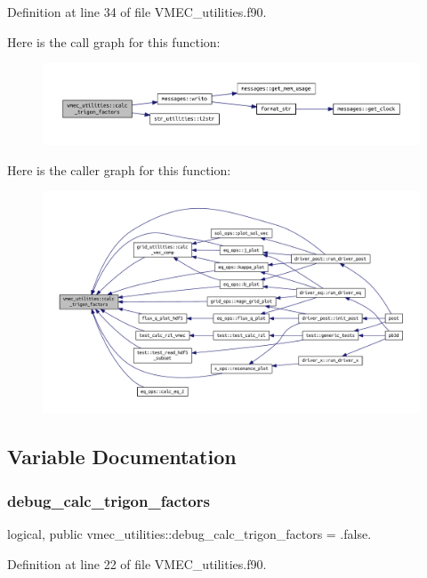 Definition at line 34 of file V\+M\+E\+C\+\_\+utilities.\+f90.

Here is the call graph for this function\+:
\nopagebreak
\begin{figure}[H]
\begin{center}
\leavevmode
\includegraphics[width=350pt]{namespacevmec__utilities_ac699116fc25fdea3e28e488513d97c87_cgraph}
\end{center}
\end{figure}
Here is the caller graph for this function\+:
\nopagebreak
\begin{figure}[H]
\begin{center}
\leavevmode
\includegraphics[width=350pt]{namespacevmec__utilities_ac699116fc25fdea3e28e488513d97c87_icgraph}
\end{center}
\end{figure}


\subsection{Variable Documentation}
\mbox{\label{namespacevmec__utilities_abeb2bf5595170bdf2dd07a6f2bfa89ff}} 
\subsubsection{\texorpdfstring{debug\+\_\+calc\+\_\+trigon\+\_\+factors}{debug\_calc\_trigon\_factors}}
{\footnotesize\ttfamily logical, public vmec\+\_\+utilities\+::debug\+\_\+calc\+\_\+trigon\+\_\+factors = .false.}



Definition at line 22 of file V\+M\+E\+C\+\_\+utilities.\+f90.

